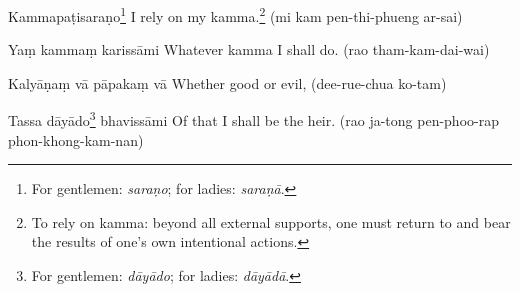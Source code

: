 \begin{chantsubsection}
  \chantgap
  \clearpage

  \chantnote
    {Kammapaṭisaraṇo\footnote{For gentlemen: \textit{saraṇo}; for ladies: \textit{saraṇā}.}}
  \chantnote
    {I rely on my kamma.\footnote{To rely on kamma: beyond all external supports,
one must return to and bear the results of one's own intentional actions.}}
  \chantindent
    {(mi kam pen-thi-phueng ar-sai)}

  \chantgap

  \chantnote
    {Yaṃ kammaṃ karissāmi}
  \chantnote
    {Whatever kamma I shall do.}
  \chantindent
    {(rao tham-kam-dai-wai)}

  \chantgap

  \chantnote
    {Kalyāṇaṃ vā pāpakaṃ vā}
  \chantnote
    {Whether good or evil,}
  \chantindent
    {(dee-rue-chua ko-tam)}

  \chantgap

  \chantnote
    {Tassa dāyādo\footnote{For gentlemen: \textit{dāyādo}; for ladies: \textit{dāyādā}.} bhavissāmi}
  \chantnote
    {Of that I shall be the heir.}
  \chantindent
    {(rao ja-tong pen-phoo-rap phon-khong-kam-nan)}
    
\end{chantsubsection}
